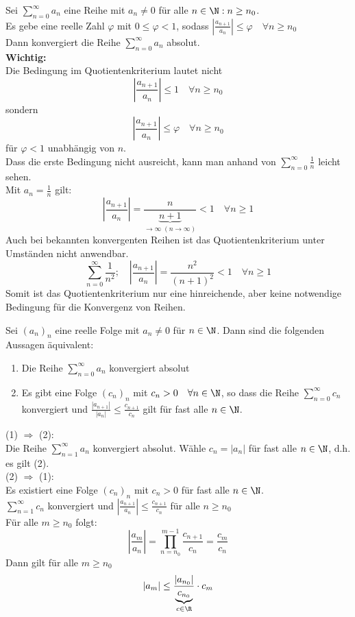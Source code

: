 \documentclass[12pt,a4paper,titlepage,draft]{article}
\begin{document}
	\begin{satz}[Quotientenkriterium]
		Sei \(\sum_{n=0}^{\infty} a_n\) eine Reihe mit \(a_n \neq 0\) für alle \(n \in \N: n \geq n_0\).\\
		Es gebe eine reelle Zahl \(\varphi\) mit \(0 \leq \varphi < 1\), sodass \(\left|\frac{a_{n+1}}{a_n}\right| \leq \varphi \quad \forall n \geq n_0\)\\
		Dann konvergiert die Reihe \(\sum_{n=0}^{\infty} a_n\) absolut.\\
		\textbf{Wichtig:}\\
		Die Bedingung im Quotientenkriterium lautet nicht 
		\[\left|\frac{a_{n+1}}{a_n}\right| \leq 1 \quad \forall n \geq n_0\]
		sondern
		\[\left|\frac{a_{n+1}}{a_n}\right| \leq \varphi \quad \forall n \geq n_0\]
		für \(\varphi < 1\) unabhängig von \(n\).\\
		Dass die erste Bedingung nicht ausreicht, kann man anhand von \(\sum_{n=0}^{\infty} \frac{1}{n}\) leicht sehen.\\
		Mit \(a_n = \frac{1}{n}\) gilt: 
		\[\left|\frac{a_{n+1}}{a_n}\right| = \frac{n}{\underbrace{n+1}_{\rightarrow \infty \; (n \rightarrow \infty)}} < 1 \quad \forall n \geq 1\]
		Auch bei bekannten konvergenten Reihen ist das Quotientenkriterium unter Umständen nicht anwendbar.
		\[\sum_{n=0}^{\infty} \frac{1}{n^2}; \quad \left|\frac{a_{n+1}}{a_n}\right| = \frac{n^2}{(n+1)^2} < 1 \quad \forall n \geq 1\]
		Somit ist das Quotientenkriterium nur eine hinreichende, aber keine notwendige Bedingung für die Konvergenz von Reihen.
	\end{satz}
	\begin{lem}
		Sei \((a_n)_n\) eine reelle Folge mit \(a_n \neq 0\) für \(n \in \N\). Dann sind die folgenden Aussagen äquivalent:
		\begin{enumerate}
			\item 
				Die Reihe \(\sum_{n=0}^{\infty} a_n\) konvergiert absolut
			\item
				Es gibt eine Folge \((c_n)_n\) mit \(c_n > 0 \quad \forall n \in \N\), so dass die Reihe \(\sum_{n=0}^{\infty} c_n\) konvergiert und	\(\frac{|a_{n+1}|}{|a_n|} \leq \frac{c_{n+1}}{c_n}\) gilt für fast alle \(n \in \N\).
		\end{enumerate}
	\end{lem}
	\begin{bew}
		(1) \(\Rightarrow\) (2):\\
		Die Reihe \(\sum_{n=1}^{\infty} a_n\) konvergiert absolut. Wähle \(c_n = |a_n|\) für fast alle \(n \in \N\), d.h. es gilt (2).\\
		(2) \(\Rightarrow\) (1):\\
		Es existiert eine Folge \((c_n)_n\) mit \(c_n > 0\) für fast alle \(n \in \N\).\\
		\(\sum_{n=1}^{\infty} c_n\) konvergiert und \(\left|\frac{a_{n+1}}{a_n}\right| \leq \frac{c_{n+1}}{c_n}\) für alle \(n \geq n_0\)\\
		Für alle \(m \geq n_0\) folgt:
		\[\left|\frac{a_{m}}{a_n}\right| = \prod_{n=n_0}^{m-1} \frac{c_{n+1}}{c_n} = \frac{c_{m}}{c_n}\]
		Dann gilt für alle \(m \geq n_0\)
		\[|a_m| \leq \frac{|a_{n_0}|}{\underbrace{c_{n_0}}_{c \in \R}} \cdot c_m \]
	\end{bew}
\end{document}
